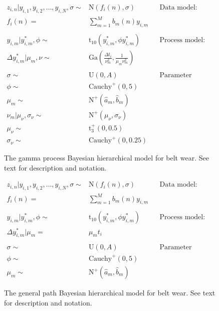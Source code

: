 \begin{figure}[tbp]
  \begin{subequations}
    \label{eq:full-gp-bw-model}
    \begin{align}
        z_{i, n}|y_{i, 1}, y_{i, 2}, \dots, y_{i, N}, \sigma \sim & \mbox{N}(f_i(n), \sigma) && \text{Data model: FDA} \\
        f_i(n)  = & \sum^{M}_{m = 1}b_m(n)y_{i, m} \\
        \nonumber \\
        y_{i, m}|y^*_{i, m}, \phi \sim & \mbox{t}_{10} (y^*_{i, m}, \phi y^*_{i, m}) && \text{Process model: Noisy GP} \\
        \Delta y^*_{i, m}|\mu_m, \nu \sim & \mbox{Ga} \left(\frac{\Delta t_i}{\nu_m^2},\frac{1}{\mu_m \nu_m^2}\right) \\
        \nonumber \\
        \sigma \sim & \mbox{U}(0, A) && \text{Parameter model: Priors} \\
        \phi \sim & \mbox{Cauchy}^{+}(0, 5) \\
        \mu_m \sim & \mbox{N}^{+}(\hat{a}_m, \hat{b}_m) \\
        \nu_m| \mu_\nu, \sigma_\nu \sim & \mbox{N}^{+}(\mu_\nu, \sigma_\nu) \\
        \mu_\nu \sim & \mbox{t}^{+}_{3}(0, 0.5) \\
        \sigma_\nu \sim & \mbox{Cauchy}^{+}(0, 0.25)
    \end{align}
  \end{subequations}
  
  \caption{The gamma process Bayesian hierarchical model for belt wear. See text for description and notation.}
  \label{fig:bhm-gp-belt-wear}
\end{figure}
  
\begin{figure}[tbp]
  \begin{subequations}
    \label{eq:full-lm-bw-model}
    \begin{align}
        z_{i, n}|y_{i, 1}, y_{i, 2}, \dots, y_{i, N}, \sigma \sim & \mbox{N}(f_i(n), \sigma) && \text{Data model: FDA} \\
        f_i(n)  = & \sum^{M}_{m = 1}b_m(n)y_{i, m} \\
        \nonumber \\
        y_{i, m}|y^*_{i, m}, \phi \sim & \mbox{t}_{10} (y^*_{i, m}, \phi y^*_{i, m}) && \text{Process model: Noisy GP} \\
        \Delta y^*_{i, m}|\mu_m = & \mu_m t_i \\
        \nonumber \\
        \sigma \sim & \mbox{U}(0, A) && \text{Parameter model: Priors} \\
        \phi \sim & \mbox{Cauchy}^{+}(0, 5) \\
        \mu_m \sim & \mbox{N}^{+}(\hat{a}_m, \hat{b}_m)
    \end{align}
  \end{subequations}
  
  \caption{The general path Bayesian hierarchical model for belt wear. See text for description and notation.}
  \label{fig:bhm-lm-belt-wear}
\end{figure}
    

